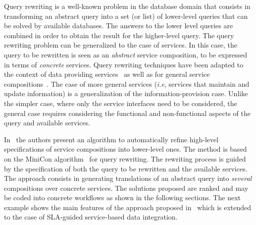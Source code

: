 

Query rewriting is a well-known problem in the database domain that consists in transforming an abstract query into a set (or list) of lower-level queries that can be solved by  available databases.
The answers to the lower level queries are combined in order to obtain the result for the higher-level query.
The query rewriting problem can be generalized to the case of services.
In this case, the query to be rewritten is seen as an \textit{abstract} service composition, to be expressed in terms of \textit{concrete} services.
Query rewriting techniques have been adapted to the context of data providing services~\cite{BBM10,ZLC11} as well as for general service compositions~\cite{CostaAMR13}. 
The case of more general services (\textit{i.e}, services that maintain and update information) is a generalization of the information-provision case.
Unlike the simpler case, where only the service interfaces need to be considered, the general case requires considering the functional and non-functional aspects of the query and available services.

In~\cite{CostaAMR13} the authors present an algorithm to automatically refine high-level specifications of service compositions into lower-level ones. 
The method is based on the MiniCon algorithm~\cite{PH01} for query rewriting.
The rewriting process is guided by the specification of both the query to be rewritten and the available services.
The approach consists in generating translations of an abstract query into \textit{several}  compositions over concrete  services. 
The solutions proposed are ranked and may be coded into concrete workflows as shown in the following sections.  
The next example shows the main features of the approach proposed in~\cite{CostaAMR13} which is extended to the case of SLA-guided service-based data integration. 

